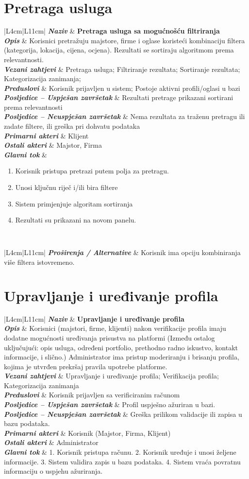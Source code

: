 \documentclass[12pt,a4paper]{article}
\newcommand{\usecase}[9]{%
\begin{longtable}{|L{4cm}|L{11cm}|}
\hline
\textbf{\textit{Naziv}} & \textbf{#1} \\
\hline
\textbf{\textit{Opis}} & #2 \\
\hline
\textbf{\textit{Vezani zahtjevi}} & #3 \\
\hline
\textbf{\textit{Preduslovi}} & #4 \\
\hline
\textbf{\textit{Posljedice -- Uspješan završetak}} & #5 \\
\hline
\textbf{\textit{Posljedice -- Neuspješan završetak}} & #6 \\
\hline
\textbf{\textit{Primarni akteri}} & #7 \\
\hline
\textbf{\textit{Ostali akteri}} & #8 \\
\hline
\textbf{\textit{Glavni tok}} & #9 \\
\hline
\end{longtable}%
}
\newcommand{\extensions}[1]{%
\vspace{-1.5em}
\begin{longtable}{|L{4cm}|L{11cm}|}
\hline
\textbf{\textit{Proširenja / Alternative}} & #1 \\
\hline
\end{longtable}%
}
\begin{document}
\pagebreak
\section{Pretraga usluga}

\usecase
{Pretraga usluga sa mogućnošću filtriranja}
{Korisnici pretražuju majstore, firme i oglase koristeći kombinaciju filtera (kategorija, lokacija, cijena, ocjena). Rezultati se sortiraju algoritmom prema relevantnosti. }
{Pretraga usluga; Filtriranje rezultata; Sortiranje rezultata; Kategorizacija zanimanja;}
{Korisnik prijavljen u sistem; Postoje aktivni profili/oglasi u bazi}
{Rezultati pretrage prikazani sortirani prema relevantnosti}
{Nema rezultata za traženu pretragu ili zadate filtere, ili greška pri dohvatu podataka}
{Klijent}
{Majstor, Firma}
{\begin{enumerate}[nosep, leftmargin=*]
        \item Korisnik pristupa pretrazi putem polja za pretragu.
        \item Unosi ključnu riječ i/ili bira filtere
        \item Sistem primjenjuje algoritam sortiranja
        \item Rezultati su prikazani na novom panelu.
    \end{enumerate}
}


\extensions{Korisnik ima opciju kombiniranja više filtera istovremeno. }



\section{Upravljanje i uređivanje profila}

\usecase
{Upravljanje i uređivanje profila}
{Korisnici (majstori, firme, klijenti) nakon verifikacije profila imaju dodatne mogućnosti uređivanja prisustva na platformi (Između ostalog uključujući: opis usluga, određeni portfolio, prethodno radno iskustvo, kontakt informacije, i slično.)
    Administrator ima pristup moderiranju i brisanju profila, kojima je utvrđen prekršaj pravila upotrebe platforme.}
{Upravljanje i uređivanje profila; Verifikacija profila; Kategorizacija zanimanja}
{Korisnik prijavljen sa verificiranim računom}
{Profil uspješno ažuriran u bazi.}
{Greška prilikom validacije ili zapisa u bazu podataka.}
{Korisnik (Majstor, Firma, Klijent)}
{Administrator}
{1. Korisnik pristupa računu. 2. Korisnik uređuje i unosi željene informacije. 3. Sistem validira zapis u bazu podataka. 4. Sistem vraća povratnu informaciju o uspjehu ažuriranja.}
\end{document}
